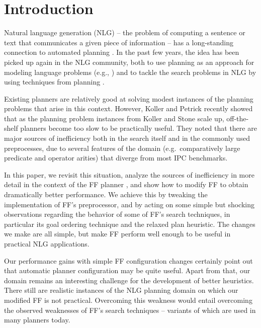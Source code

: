 
\section{Introduction} \label{sec:introduction}

Natural language generation (NLG) -- the problem of computing a
sentence or text that communicates a given piece of information -- has
a long-standing connection to automated planning \cite{perrault80}. In
the past few years, the idea has been picked up again in the NLG
community, both to use planning as an approach for modeling language
problems (e.g., \cite{Steedman-Petrick:07}) and to tackle the search
problems in NLG by using techniques from planning \cite{KolSto07}.

Existing planners are relatively good at solving modest instances of
the planning problems that arise in this context. However, Koller and
Petrick 
recently showed that as the planning problem instances from Koller and
Stone  scale up, off-the-shelf planners become too
slow to be practically useful. They noted that there are major sources
of inefficiency both in the search itself and in the commonly used
preprocesses, due to several features of the domain
(e.g.\ comparatively large predicate and operator arities) that
diverge from most IPC benchmarks.

In this paper, we revisit this situation, analyze the sources of
inefficiency in more detail in the context of the FF planner
\cite{HoffmannNebel01}, and show how to modify FF to obtain
dramatically better performance. We achieve this by tweaking the
implementation of FF's preprocessor, and by acting on some simple but
shocking observations regarding the behavior of some of FF's search
techniques, in particular its goal ordering technique and the relaxed
plan heuristic. The changes we make are all simple, but make FF
perform well enough to be useful in practical NLG applications.



Our performance gains with simple FF configuration changes certainly
point out that automatic planner configuration may be quite
useful. Apart from that, our domain remains an interesting challenge
for the development of better heuristics. There still are realistic
instances of the NLG planning domain on which our modified FF is not
practical. Overcoming this weakness would entail overcoming the
observed weaknesses of FF's search techniques -- variants of which are
used in many planners today.


